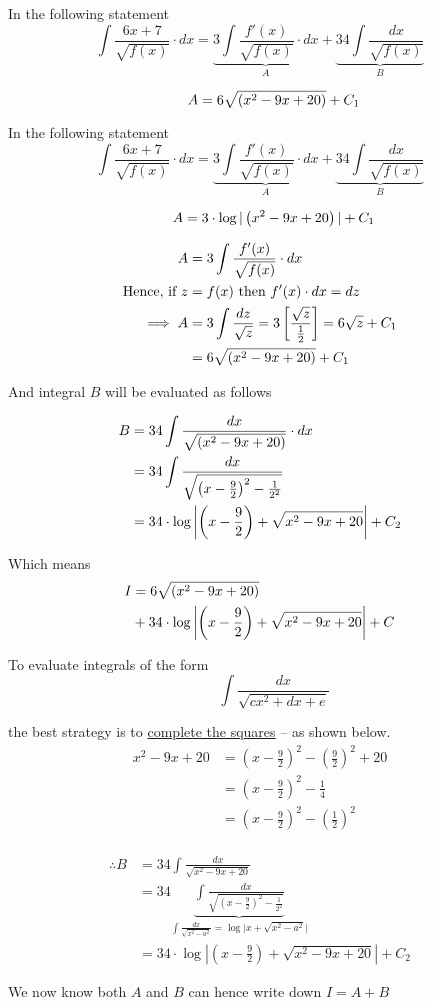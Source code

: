 \documentclass[14pt,fleqn]{extarticle}
\begin{document}
\newcard 

In the following statement 
\small\[ \int \frac{6x+7}{\sqrt{f(x)}}\cdot dx = \underbrace{3\int \frac{f'(x)}{\sqrt{f(x)}}\cdot dx}_A + \underbrace{34\int \frac{dx}{\sqrt{f(x)}}}_B \]\normalsize

\[ \qquad A = 6\sqrt{\left(x^2-9x +20 \right)} + C_1\]

\newcard 

In the following statement 
\small\[ \int \frac{6x+7}{\sqrt{f(x)}}\cdot dx = \underbrace{3\int \frac{f'(x)}{\sqrt{f(x)}}\cdot dx}_A + \underbrace{34\int \frac{dx}{\sqrt{f(x)}}}_B \]\normalsize

\[ \qquad A = 3\cdot\log\vert \left(x^2-9x +20 \right)\vert  + C_1\]

\newcard 

\begin{align}
A &= 3\int \frac{f'(x)}{\sqrt{f(x)}} \cdot dx \\
\text{Hence, if } z &= f(x)\text{ then } f'(x)\cdot dx = dz \\
\implies A  &= 3\int \frac{dz}{\sqrt{z}} = 3 \left[\frac{\sqrt{z}}{\frac{1}{2}} \right] = 6\sqrt{z} + C_1 \\
&= 6\sqrt{\left(x^2-9x +20 \right)} + C_1 
\end{align}

\newcard 

And integral $B$ will be evaluated as follows 

\begin{align}
B &= 34 \int \frac{dx}{\sqrt{\left(x^2-9x +20 \right)}}\cdot dx \\
&= 34\int\frac{dx}{\sqrt{\left(x-\frac{9}{2}\right)^2 -\frac{1}{2^2}}} \\
&= 34\cdot\log\left\vert \left( x-\frac{9}{2}\right) + \sqrt{x^2-9x+20} \right\vert + C_2 
\end{align} 

Which means 
\begin{align}
	I &= 6\sqrt{\left(x^2-9x +20 \right)}  \\
	&+ 34\cdot\log\left\vert \left( x-\frac{9}{2}\right) + \sqrt{x^2-9x+20} \right\vert + C 
\end{align} 

\newcard 

To evaluate integrals of the form 
\[\qquad \int\frac{dx}{\sqrt{cx^2+dx+e}} \] 

the best strategy is to \underline{complete the squares} 
-- as shown below. 
%
\begin{align}
x^2-9x+20 &= \left(x-\frac{9}{2} \right)^2 -\left(\frac{9}{2}\right)^2 + 20  \\
&= \left(x-\frac{9}{2}\right)^2 -\frac{1}{4}\\
&= \left(x-\frac{9}{2}\right)^2 -\left(\frac{1}{2}\right)^2
\end{align}\\
\begin{align}
\therefore B &= 34\int\frac{dx}{\sqrt{x^2-9x+20}} \\
&= 34\underbrace{\int\frac{dx}{\sqrt{\left(x-\frac{9}{2}\right)^2 -\frac{1}{2^2}}}}
_{\int\frac{dx}{\sqrt{x^2-a^2}}= \log\vert x + \sqrt{x^2-a^2}\vert} \\
&= 34\cdot\log\left\vert \left( x-\frac{9}{2}\right) + \sqrt{x^2-9x+20} \right\vert + C_2 
\end{align}

We now know both $A$ and $B$ can hence write down $I = A+B$
\end{document}
